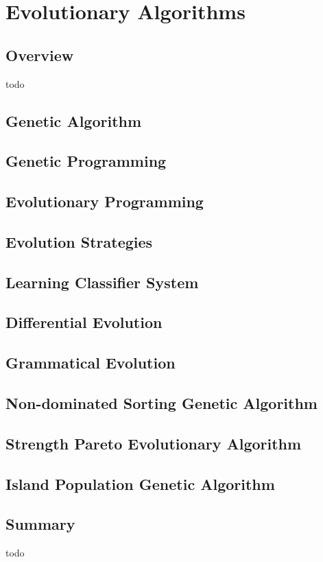 


\chapter{Evolutionary Algorithms}
\label{ch:evolutionary}

\section{Overview}
todo

\section{Genetic Algorithm}
\section{Genetic Programming}
\section{Evolutionary Programming}
\section{Evolution Strategies}
\section{Learning Classifier System}
\section{Differential Evolution}
\section{Grammatical Evolution}
\section{Non-dominated Sorting Genetic Algorithm}
\section{Strength Pareto Evolutionary Algorithm}
\section{Island Population Genetic Algorithm}


\section{Summary}
todo
